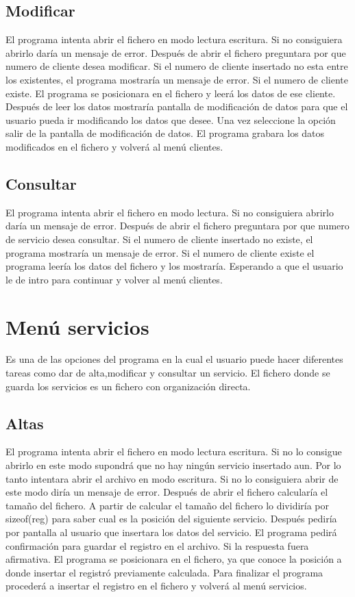 \documentclass[12pt]{article}
\begin{document}
\subsection{Modificar}
El programa intenta abrir el fichero en modo lectura escritura. Si no consiguiera abrirlo daría un mensaje de error. Después de abrir el fichero preguntara por que numero de cliente desea modificar. Si el numero de cliente insertado no esta entre los existentes, el programa mostraría un mensaje de error. Si el numero de cliente existe. El programa se posicionara en el fichero y leerá los datos de ese cliente. Después de leer los datos mostraría pantalla de modificación de datos para que el usuario pueda ir modificando los datos que desee. Una vez seleccione la opción salir de la pantalla de modificación de datos. El programa grabara los datos modificados en el fichero y volverá al menú clientes.
\subsection{Consultar}
El programa intenta abrir el fichero en modo lectura. Si no consiguiera abrirlo daría un mensaje de error. Después de abrir el fichero preguntara por que numero de servicio desea consultar. Si el numero de cliente insertado no existe, el programa mostraría un mensaje de error. Si el numero de cliente existe el programa leería los datos del fichero y los mostraría. Esperando a que el usuario le de intro para continuar y volver al menú clientes.
\newpage
\section{Menú servicios}
Es una de las opciones del programa en la cual el usuario puede hacer diferentes tareas como dar de alta,modificar y consultar un servicio. El fichero donde se guarda los servicios es un fichero con organización directa.
\subsection{Altas}
El programa intenta abrir el fichero en modo lectura escritura. Si no lo consigue abrirlo en este modo supondrá que no hay ningún servicio insertado aun. Por lo tanto intentara abrir el archivo en modo escritura. Si no lo consiguiera abrir de este modo diría un mensaje de error. Después de abrir el fichero calcularía el tamaño del fichero. A partir de calcular el tamaño del fichero lo dividiría por sizeof(reg) para saber cual es la posición del siguiente servicio. Después pediría por pantalla al usuario que insertara los datos del servicio. El programa pedirá confirmación para guardar el registro en el archivo. Si la respuesta fuera afirmativa. El programa se  posicionara en el fichero, ya que conoce la posición a donde insertar el registró previamente calculada. Para finalizar el programa procederá a insertar el registro en el fichero y volverá al menú servicios.
\end{document}

